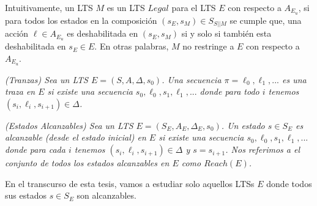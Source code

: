 Intuitivamente, un LTS $M$ es un LTS $Legal$ para el LTS $E$ con respecto a $A_{E_u}$, si para todos los estados en la
composición $(s_E,s_M) \in S_{S||M}$ se cumple que, una acción $\ell \in A_{E_u}$ es deshabilitada en $(s_E,s_M)$ si y solo
si también esta deshabilitada en $s_E \in E$. En otras palabras, $M$ no restringe a $E$ con respecto a $A_{E_u}$.


\begin{nahaDef}
    \emph{(Tranzas) Sea un LTS $E = (S,A,\Delta,s_0)$. Una secuencia $\pi = \ell_0,\ell_1,...$ es una traza en $E$ si existe una
    secuencia $s_0,\ell_0,s_1,\ell_1,...$ donde para todo $i$ tenemos $(s_i,\ell_i,s_{i+1}) \in \Delta$.}
\end{nahaDef} 


\begin{nahaDef}
    \emph{(Estados Alcanzables) Sea un LTS $E = (S_E, A_E, \Delta_E, s_0)$. Un estado $s \in S_E$ es alcanzable (desde
    el estado inicial) en $E$ si existe una secuencia $s_0,\ell_0,s_1,\ell_1,...$ donde para cada $i$ tenemos
    $(s_i,\ell_i,s_{i+1}) \in \Delta$ y $s = s_{i+1}$. Nos referimos a el conjunto de todos los estados alcanzables en $E$
    como $Reach(E)$.}
\end{nahaDef} 

En el transcurso de esta tesis, vamos a estudiar solo aquellos LTSs $E$ donde todos sus estados $s \in S_E$ son
alcanzables.

